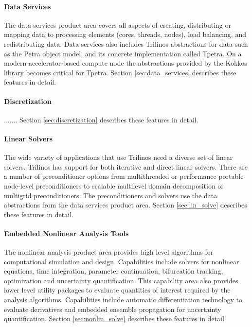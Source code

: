 \paragraph{Data Services} The data services product area covers all aspects of creating, distributing or mapping data to processing elements (cores, threads, nodes), load balancing, and redistributing data. Data services also includes Trilinos abstractions for data such as the Petra object model, and its concrete implementation called Tpetra. On a modern accelerator-based compute node the abstractions provided by the Kokkos library becomes critical for Tpetra. Section \ref{sec:data_services} describes these features in detail.
 
\paragraph{Discretization}  ....... Section \ref{sec:discretization} describes these features in detail.


\paragraph{Linear Solvers} The wide variety of applications that use Trilinos need a diverse set of linear solvers. Trilinos has support for both iterative and direct linear solvers. There are a number of preconditioner options from multithreaded or performance portable node-level preconditioners to scalable multilevel domain decomposition or multigrid preconditioners. The preconditioners and solvers use the data abstractions from the data services product area. Section \ref{sec:lin_solve} describes these features in detail.

\paragraph{Embedded Nonlinear Analysis Tools} The nonlinear analysis product area provides high level algorithms for computational simulation and design. Capabilities include solvers for nonlinear equations, time integration, parameter continuation, bifurcation tracking, optimization and uncertainty quantification. This capability area also provides lower level utility packages to evaluate quantities of interest required by the analysis algorithms. Capabilities include automatic differentiation technology to evaluate derivatives and embedded ensemble propagation for uncertainty quantification. Section \ref{sec:nonlin_solve} describes these features in detail.

